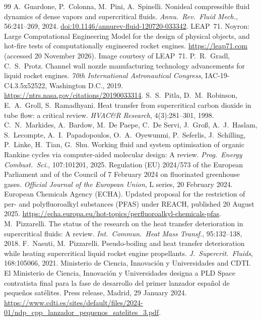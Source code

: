 \documentclass[11pt]{article}
\begin{document}
\begin{thebibliography}{99}\small
{}
A.\ Guardone, P.\ Colonna, M.\ Pini, A.\ Spinelli.
Nonideal compressible fluid dynamics of dense vapors and supercritical fluids.
\emph{Annu.\ Rev.\ Fluid Mech.}, 56:241--269, 2024.
\href{https://doi.org/10.1146/annurev-fluid-120720-033342}{doi:10.1146/annurev-fluid-120720-033342}.
 LEAP~71. Noyron: Large Computational Engineering Model for the design of physical objects, and hot-fire tests of computationally engineered rocket engines. \url{https://leap71.com} (accessed 20 November 2026). Image courtesy of LEAP~71.
 P.\ R.\ Gradl, C.\ S.\ Protz. Channel wall nozzle manufacturing technology advancements for liquid rocket engines. \emph{70th International Astronautical Congress}, IAC-19-C4.3.5x52522, Washington D.C., 2019. \url{https://ntrs.nasa.gov/citations/20190033314}.
 S.\ S.\ Pitla, D.\ M.\ Robinson, E.\ A.\ Groll, S.\ Ramadhyani. Heat transfer from supercritical carbon dioxide in tube flow: a critical review. \emph{HVAC\&R Research}, 4(3):281--301, 1998.
 C.\ N.\ Markides, A.\ Bardow, M.\ De Paepe, C.\ De Servi, J.\ Gro\ss, A.\ J.\ Haslam, S.\ Lecompte, A.\ I.\ Papadopoulos, O.\ A.\ Oyewunmi, P.\ Seferlis, J.\ Schilling, P.\ Linke, H.\ Tian, G.\ Shu. Working fluid and system optimisation of organic Rankine cycles via computer-aided molecular design: A review. \emph{Prog.\ Energy Combust.\ Sci.}, 107:101201, 2025.
 Regulation (EU) 2024/573 of the European Parliament and of the Council of 7 February 2024 on fluorinated greenhouse gases. \emph{Official Journal of the European Union}, L series, 20 February 2024.
 European Chemicals Agency (ECHA). Updated proposal for the restriction of per- and polyfluoroalkyl substances (PFAS) under REACH, published 20 August 2025. \url{https://echa.europa.eu/hot-topics/perfluoroalkyl-chemicals-pfas}.
 M.\ Pizzarelli. The status of the research on the heat transfer deterioration in supercritical fluids: A review. \emph{Int.\ Commun.\ Heat Mass Transf.}, 95:132--138, 2018.
 F.\ Nasuti, M.\ Pizzarelli. Pseudo-boiling and heat transfer deterioration while heating supercritical liquid rocket engine propellants. \emph{J.\ Supercrit.\ Fluids}, 168:105066, 2021.
 Ministerio de Ciencia, Innovaci\'on y Universidades and CDTI. El Ministerio de Ciencia, Innovaci\'on y Universidades designa a PLD Space contratista final para la fase de desarrollo del primer lanzador espa\~nol de peque\~nos sat\'elites. Press release, Madrid, 29 January 2024. \url{https://www.cdti.es/sites/default/files/2024-01/ndp_cpp_lanzador_pequenos_satelites_3.pdf}.

\end{thebibliography}
\end{document}

